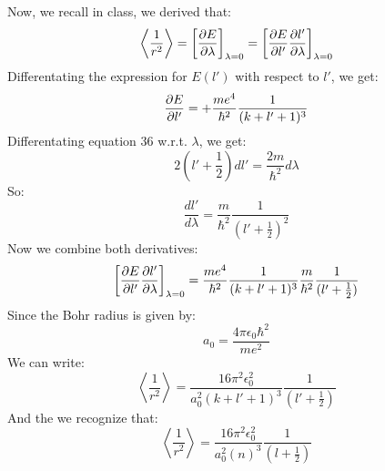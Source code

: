 \documentclass[12pt]{article}
\begin{document}
Now, we recall in class, we derived that:
\begin{equation}
  \left\langle\frac{1}{r^{2}}\right\rangle = \left[\pdv{E}{\lambda}\right]_{\lambda=0} = \left[\pdv{E}{l'}\pdv{l'}{\lambda}\right]_{\lambda=0}
\end{equation}
Differentating the expression for $E(l')$ with respect to $l'$, we get:
\begin{equation}
  \pdv{E}{l'} = + \frac{me^4}{\hbar^2} \frac{1}{(k+l'+1)^3}
\end{equation}
Differentating equation 36 w.r.t. $\lambda$, we get:
\begin{equation}
  2\left(l' + \frac{1}{2}\right) dl' = \frac{2m}{\hbar^2} d\lambda
\end{equation}
So:
\begin{equation}
  \frac{dl'}{d\lambda} = \frac{m}{\hbar^2} \frac{1}{(l' + \frac{1}{2})^2}
\end{equation}
Now we combine both derivatives:
\begin{equation}
  \left[\pdv{E}{l'}\pdv{l'}{\lambda}\right]_{\lambda=0} = \frac{me^4}{\hbar^2} \frac{1}{(k+l'+1)^3} \frac{m}{\hbar^2} \frac{1}{(l' + \frac{1}{2})}
\end{equation}
Since the Bohr radius is given by:
\begin{equation}
  a_0 = \frac{4\pi\epsilon_0\hbar^2}{me^2}
\end{equation}
We can write:
\begin{equation}
  \left\langle\frac{1}{r^{2}}\right\rangle = \frac{16\pi^2\epsilon_0^2}{a_0^2(k+l'+1)^3} \frac{1}{(l' + \frac{1}{2})}
\end{equation}
And the we recognize that:
\begin{equation}
  \left\langle\frac{1}{r^{2}}\right\rangle = \frac{16\pi^2\epsilon_0^2}{a_0^2(n)^3} \frac{1}{(l + \frac{1}{2})}
\end{equation}
\end{document}
